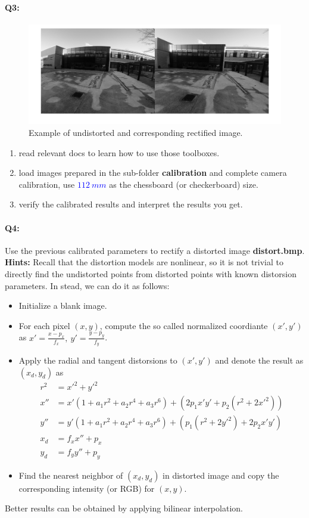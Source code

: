 \documentclass[a4paper]{article}
\begin{document}
\paragraph{Q3:} 
\begin{figure}[!b]
\centering
\includegraphics[scale=0.2]{figures/rec.png}
\caption{Example of undistorted and corresponding rectified image.}
\end{figure}
\begin{enumerate}
\item read relevant docs to learn how to use those toolboxes.
\item load images prepared in the sub-folder \textbf{calibration} and complete camera calibration, use \textcolor{blue}{$112\ mm$} as the chessboard (or checkerboard) size.
\item verify the calibrated results and interpret the results you get.
\end{enumerate}
\paragraph{Q4:} 
Use the previous calibrated parameters to rectify a distorted image \textbf{distort.bmp}. 
\textbf{Hints:}
Recall that the distortion models are nonlinear, so it is not trivial to directly find the undistorted points from distorted points with known distorsion parameters. In stead, we can do it as follows:
\begin{itemize}
	\item Initialize a blank image.
	\item For each pixel $(x,y)$, compute the so called normalized coordiante $(x',y')$ as $x'=\frac{x-p_x}{f_x},\ y'=\frac{y-p_y}{f_y}$.
	\item Apply the radial and tangent distorsions to $(x',y')$ and denote the result as $(x_d,y_d)$ as
	\begin{align*}
		r^2 &= x'^2+y'^2 \\
		x'' &= x'(1+a_1r^2+a_2r^4+a_3r^6)+(2p_1x'y'+p_2(r^2+2x'^2)) \\
		y'' &= y'(1+a_1r^2+a_2r^4+a_3r^6)+(p_1(r^2+2y'^2)+2p_2x'y') \\
		x_d &= f_xx''+p_x\\
		y_d &=f_yy''+p_y
	\end{align*}

	\item Find the nearest neighbor of $(x_d,y_d)$ in distorted image and copy the corresponding intensity (or RGB) for $(x,y)$. 
\end{itemize}
Better results can be obtained by applying bilinear interpolation.
\end{document}
